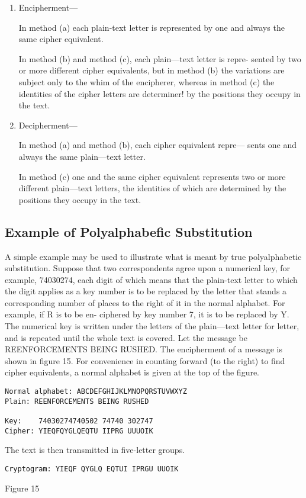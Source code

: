 \begin{enumerate}
\item Encipherment—

In method (a) each plain-text letter is represented by one and
always the same cipher equivalent.

In method (b) and method (c), each plain—text letter is repre-
sented by two or more different cipher equivalents, but in
method (b) the variations are subject only to the whim of the
encipherer, whereas in method (c) the identities of the cipher
letters are determiner! by the positions they occupy in the
text.

\item Decipherment—

In method (a) and method (b), each cipher equivalent repre—
sents one and always the same plain—text letter.

In method (c) one and the same cipher equivalent represents
two or more different plain—text letters, the identities of
which are determined by the positions they occupy in the
text.
\end{enumerate}


\subsection{Example of Polyalphabeﬁc Substitution}

\mypara A simple example may be used to illustrate what is meant by true
polyalphabetic substitution. Suppose that two correspondents agree upon
a numerical key, for example, 74030274, each digit of which means
that the plain-text letter to which the digit applies as a key number is to
be replaced by the letter that stands a corresponding number of places to
the right of it in the normal alphabet. For example, if R is to be en-
ciphered by key number 7, it is to be replaced by Y. The numerical key is
written under the letters of the plain—text letter for letter, and is repeated
until the whole text is covered. Let the message be REENFORCEMENTS BEING RUSHED. The encipherment of a message is shown
in ﬁgure 15. For convenience in counting forward (to the right) to ﬁnd
cipher equivalents, a normal alphabet is given at the top of the ﬁgure.

\begin{textfigure}
\begin{verbatim}
Normal alphabet: ABCDEFGHIJKLMNOPQRSTUVWXYZ
Plain: REENFORCEMENTS BEING RUSHED

Key:    74030274740502 74740 302747
Cipher: YIEQFQYGLQEQTU IIPRG UUUOIK
\end{verbatim}

The text is then transmitted in ﬁve-letter groups.
\begin{verbatim}
Cryptogram: YIEQF QYGLQ EQTUI IPRGU UUOIK
\end{verbatim}
        \caption{Figure 15}
\end{textfigure}


